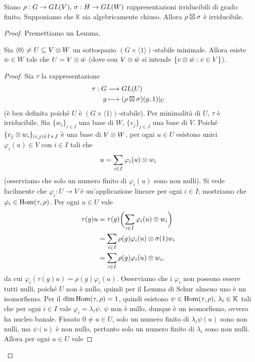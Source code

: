 \begin{proposition}
Siano $\rho:G\to GL(V),\,\allowbreak\sigma:H\to GL(W)$ rappresentazioni irriducibili di grado finito. Supponiamo che $\mathbb{K}$ sia algebricamente chiuso. Allora $\rho\boxtimes\sigma$ è irriducibile.
\end{proposition}
\begin{proof}
Premettiamo un Lemma.
\begin{lemma*}
Sia $\langle0\rangle\neq U\subseteq V\otimes W$ un sottospazio $(G\times\langle1\rangle)$-stabile minimale. Allora esiste $\bar{w}\in W$ tale che $U=V\otimes\bar{w}$ (dove con $V\otimes\bar{w}$ si intende $\{v\otimes\bar{w}:v\in V\}$).
\end{lemma*}
\begin{proof}
Sia $\tau$ la rappresentazione
\begin{align*}
\tau:G&\longrightarrow GL(U)\\
g&\longmapsto (\rho\boxtimes\sigma)(g,1)|_U
\end{align*}
(è ben definita poiché $U$ è $(G\times\langle1\rangle)$-stabile). Per minimalità di $U$, $\tau$ è irriducibile. Sia $\{w_i\}_{i\in I}$ una base di $W$, $\{v_j\}_{j\in J}$ una base di $V$. Poiché $\{v_j\otimes w_i\}_{(i,j)\in I\times J}$ è una base di $V\otimes W$, per ogni $u\in U$ esistono unici $\varphi_i(u)\in V$ con $i\in I$ tali che
$$
u=\sum_{i\in I}\varphi_i(u)\otimes w_i
$$
(osserviamo che solo un numero finito di $\varphi_i(u)$ sono non nulli). Si vede facilmente che $\varphi_i:U\to V$ è un'applicazione lineare per ogni $i\in I$; mostriamo che $\varphi_i\in\operatorname{Hom}(\tau,\rho)$. Per ogni $u\in U$ vale
\begin{align*}
\tau(g)u&=\tau(g)\biggl(\sum_{i\in I}\varphi_i(u)\otimes w_i\biggr)\\
&=\sum_{i\in I}\rho(g)\varphi_i(u)\otimes\sigma(1)w_i\\
&=\sum_{i\in I}\rho(g)\varphi_i(u)\otimes w_i,
\end{align*}
da cui $\varphi_i(\tau(g)u)=\rho(g)\varphi_i(u)$. Osserviamo che i $\varphi_i$ non possono essere tutti nulli, poiché $U$ non è nullo, quindi per il Lemma di Schur almeno uno è un isomorfismo. Per il  $\dim\operatorname{Hom}(\tau,\rho)=1$, quindi esistono $\psi\in\operatorname{Hom}(\tau,\rho),\,\allowbreak\lambda_i\in\mathbb{K}$ tali che per ogni $i\in I$ vale $\varphi_i=\lambda_i\psi$. $\psi$ non è nullo, dunque è un isomorfismo, ovvero ha nucleo banale. Fissato $0\neq u\in U$, solo un numero finito di $\lambda_i\psi(u)$ sono non nulli, ma $\psi(u)$ è non nullo, pertanto solo un numero finito di $\lambda_i$ sono non nulli. Allora per ogni $u\in U$ vale

\end{proof}
\end{proof}
